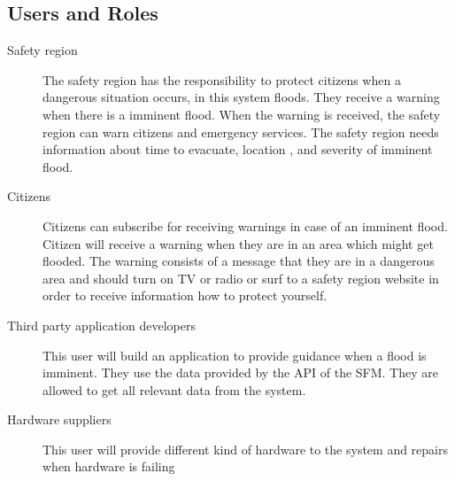 \subsection{Users and Roles}
\begin{description}
	\item[Safety region] The safety region has the responsibility to protect citizens when a dangerous situation occurs, in this system floods. They receive a warning when there is a imminent flood. When the warning is received, the safety region can warn citizens and emergency services. The safety region needs information about time to evacuate, location , and severity of imminent flood.
	\item[Citizens] Citizens can subscribe for receiving warnings in case of an imminent flood. Citizen will receive a warning when they are in an area which might get flooded. The warning consists of a message that they are in a dangerous area and should turn on TV or radio or surf to a safety region website in order to receive information how to protect yourself.
	\item[Third party application developers] This user will build an application to provide guidance when a flood is imminent. They use the data provided by the API of the SFM. They are allowed to get all relevant data from the system.
	\item[Hardware suppliers] This user will provide different kind of hardware to the system and repairs when hardware is failing
\end{description} 

